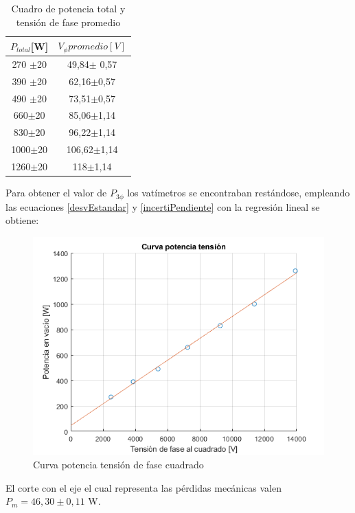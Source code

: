 \documentclass[11pt,letterpaper]{article}     %
\begin{document}
\begin{table}[H]
	\centering
	\caption{Cuadro de potencia total y tensión de fase promedio}
	\label{cuado: p3f y Vf}
	\begin{tabular}{|c|c|}
		\hline
		$P_{total}$[W]&$V_{\phi}promedio [V]$ \\ \hline
		270 $\pm$20&49,84$\pm$ 0,57\\ \hline
		390 $\pm$20&62,16$\pm$0,57 \\ \hline
		490 $\pm$20&73,51$\pm$0,57 \\ \hline
		660$\pm$20&85,06$\pm$1,14 \\ \hline
		830$\pm$20&96,22$\pm$1,14 \\ \hline
		1000$\pm$20&106,62$\pm$1,14 \\ \hline
		1260$\pm$20 & 118$\pm$1,14 \\ \hline		
	\end{tabular}
\end{table}

Para obtener el valor de $P_{3\phi}$ los vatímetros se encontraban restándose, empleando las ecuaciones \ref{desvEstandar} y \ref{incertiPendiente} con la regresión lineal se obtiene:

\begin{figure}[H]
	\centering
	\includegraphics[scale=0.8]{./recursos-Lab8/curvaPruebaVacioPotenciaVsTensionCuadrado.png}
	\caption{Curva potencia tensión de fase cuadrado}
	\label{fig:curvaPotenciaTensionCuadrado}
\end{figure}

El corte con el eje el cual representa las pérdidas mecánicas valen $P_m=46,30\pm 0,11$ W.
\end{document}

